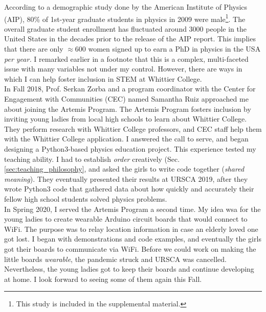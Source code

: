 \documentclass[../../../main.tex]{subfiles}
\begin{document}
According to a demographic study done by the American Institute of Physics (AIP), 80\% of 1st-year graduate students in physics in 2009 were male\footnote{This study is included in the supplemental material.}.  The overall graduate student enrollment has fluctuated around 3000 people in the United States in the decades prior to the release of the AIP report.  This implies that there are only $\approx 600$ women signed up to earn a PhD in physics in the USA \textit{per year.}  I remarked earlier in a footnote that this is a complex, multi-faceted issue with many variables not under my control.  However, there are ways in which I can help foster inclusion in STEM at Whittier College.
\\
\vspace{0.25cm}
In Fall 2018, Prof. Serkan Zorba and a program coordinator with the Center for Engagement with Communities (CEC) named Samantha Ruiz approached me about joining the Artemis Program.  The Artemis Program fosters inclusion by inviting young ladies from local high schools to learn about Whittier College.  They perform research with Whittier College professors, and CEC staff help them with the Whittier College application.  I answered the call to serve, and began designing a Python3-based physics education project.  This experience tested my teaching ability.  I had to establish \textit{order} creatively (Sec. \ref{sec:teaching_philosophy}, and asked the girls to write code together (\textit{shared meaning}).  They eventually presented their results at URSCA 2019, after they wrote Python3 code that gathered data about how quickly and accurately their fellow high school students solved physics problems.
\\
\vspace{0.25cm}
In Spring 2020, I served the Artemis Program a second time.  My idea wsa for the young ladies to create wearable Arduino circuit boards that would connect to WiFi.  The purpose was to relay location information in case an elderly loved one got lost.  I began with demonstrations and code examples, and eventually the girls got their boards to communicate via WiFi.  Before we could work on making the little boards \textit{wearable}, the pandemic struck and URSCA was cancelled.  Nevertheless, the young ladies got to keep their boards and continue developing at home.  I look forward to seeing some of them again this Fall.
\end{document}
